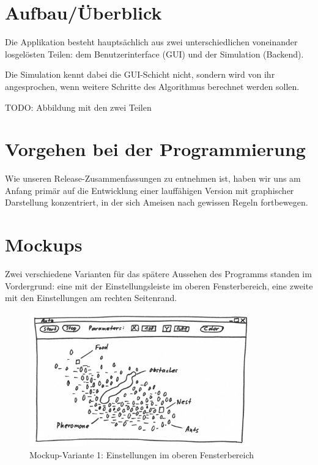 \section{Aufbau/Überblick}

Die Applikation besteht hauptsächlich aus zwei unterschiedlichen voneinander losgelösten Teilen: dem Benutzerinterface (GUI) und der Simulation (Backend).

Die Simulation kennt dabei die GUI-Schicht nicht, sondern wird von ihr angesprochen, wenn weitere Schritte des Algorithmus berechnet werden sollen.

TODO: Abbildung mit den zwei Teilen

\section{Vorgehen bei der Programmierung}

Wie unseren Release-Zusammenfassungen zu entnehmen ist, haben wir uns am Anfang primär auf die Entwicklung einer lauffähigen Version mit graphischer Darstellung konzentriert, in der sich Ameisen nach gewissen Regeln fortbewegen. 

\section{Mockups}

Zwei verschiedene Varianten für das spätere Aussehen des Programms standen im Vordergrund: eine mit der Einstellungsleiste im oberen Fensterbereich, eine zweite mit den Einstellungen am rechten Seitenrand.

\begin{figure}[h]
  \centering
	\includegraphics [width=0.85\textwidth]{images/Antz_Mockup_1_sw.png} 
	\caption{Mockup-Variante 1: Einstellungen im oberen Fensterbereich}
\end{figure}

